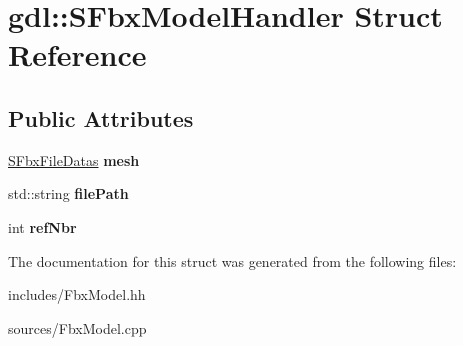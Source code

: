 \hypertarget{structgdl_1_1_s_fbx_model_handler}{\section{gdl\-:\-:S\-Fbx\-Model\-Handler Struct Reference}
\label{structgdl_1_1_s_fbx_model_handler}
}
\subsection*{Public Attributes}
\begin{DoxyCompactItemize}
\item 
\hypertarget{structgdl_1_1_s_fbx_model_handler_a3a36497ea8a813dd9951fe54281cae0b}{\hyperlink{structgdl_1_1_s_fbx_file_datas}{S\-Fbx\-File\-Datas} {\bfseries mesh}}\label{structgdl_1_1_s_fbx_model_handler_a3a36497ea8a813dd9951fe54281cae0b}

\item 
\hypertarget{structgdl_1_1_s_fbx_model_handler_af6f4d3f52190811537c5526c48246908}{std\-::string {\bfseries file\-Path}}\label{structgdl_1_1_s_fbx_model_handler_af6f4d3f52190811537c5526c48246908}

\item 
\hypertarget{structgdl_1_1_s_fbx_model_handler_a559b190b311ad05a6b32a67f8c7e4a4e}{int {\bfseries ref\-Nbr}}\label{structgdl_1_1_s_fbx_model_handler_a559b190b311ad05a6b32a67f8c7e4a4e}

\end{DoxyCompactItemize}


The documentation for this struct was generated from the following files\-:\begin{DoxyCompactItemize}
\item 
includes/Fbx\-Model.\-hh\item 
sources/Fbx\-Model.\-cpp\end{DoxyCompactItemize}
